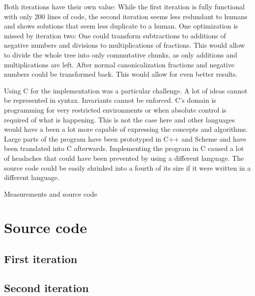 \documentclass[11pt,a4paper]{article}
\begin{document}
Both iterations have their own value:
While the first iteration is fully functional with only 200 lines of
code, the second iteration seems less redundant to humans and shows
solutions that seem less duplicate to a human.
One optimization is missed by iteration two: One could transform
subtractions to additions of negative numbers and divisions to
multiplications of fractions.
This would allow to divide the whole tree into only commutative
chunks, as only additions and multiplications are left.
After normal canonicalization fractions and negative numbers could be
transformed back.
This would allow for even better results.

Using C for the implementation was a particular challenge.
A lot of ideas cannot be represented in syntax. Invariants cannot be
enforced. C's domain is programming for very restricted environments
or when absolute control is required of what is happening.
This is not the case here and other languages would have a been a lot
more capable of expressing the concepts and algorithms.
Large parts of the program have been prototyped in C++ and Scheme and
have been translated into C afterwards.
Implementing the program in C caused a lot of headaches that could
have been prevented by using a different language.
The source code could be easily shrinked into a fourth of its size if
it were written in a different language.




\FloatBarrier
\clearpage
\huge{Measurements and source code}

\section{Source code}
\label{sec:src}
\subsection{First iteration}



\subsection{Second iteration}


\end{document}
